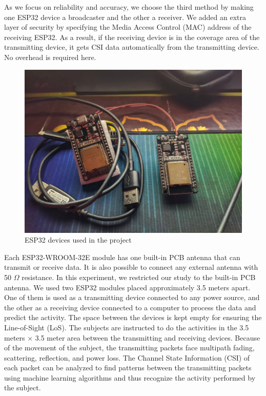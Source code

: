 As we focus on reliability and accuracy, we choose the third method by making one ESP32 device a broadcaster and the other a receiver. We added an extra layer of security by specifying the Media Access Control (MAC) address of the receiving ESP32. As a result, if the receiving device is in the coverage area of the transmitting device, it gets CSI data automatically from the transmitting device. No overhead is required here.

        \begin{figure}[H]
        \centering
        \includegraphics[width=1\textwidth, trim={0 0 0 6cm}, clip]{./figure/chap 4/myesp.jpg}
        \caption{ESP32 devices used in the project}
        \label{Fig 4.4}
        \end{figure}


Each ESP32-WROOM-32E module has one built-in PCB antenna that can transmit or receive data. It is also possible to connect any external antenna with 50 $\Omega$ resistance. In this experiment, we restricted our study to the built-in PCB antenna. We used two ESP32 modules placed approximately 3.5 meters apart. One of them is used as a transmitting device connected to any power source, and the other as a receiving device connected to a computer to process the data and predict the activity. The space between the devices is kept empty for ensuring the Line-of-Sight (LoS). The subjects are instructed to do the activities in the 3.5 meters $\times$ 3.5 meter area between the transmitting and receiving devices. Because of the movement of the subject, the transmitting packets face multipath fading, scattering, reflection, and power loss. The Channel State Information (CSI) of each packet can be analyzed to find patterns between the transmitting packets using machine learning algorithms and thus recognize the activity performed by the subject.

